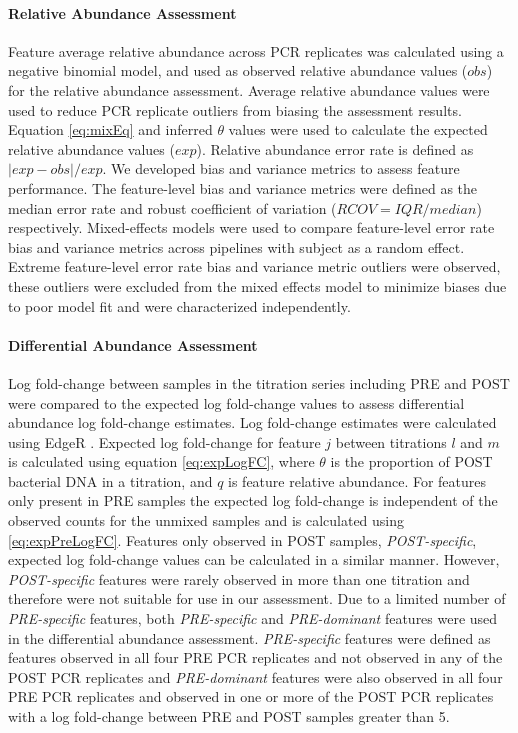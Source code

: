\documentclass[linenumbers]{bmcart}
\begin{document}
\paragraph{Relative Abundance Assessment}

Feature average relative abundance across PCR
replicates was calculated using a negative binomial model, and used as
observed relative abundance values (\(obs\)) for the relative abundance
assessment. Average relative abundance values were used to reduce PCR
replicate outliers from biasing the assessment results. Equation
\eqref{eq:mixEq} and inferred \(\theta\) values were used to calculate the
expected relative abundance values (\(exp\)). Relative abundance error
rate is defined as \(|exp - obs|/exp\).
We developed bias and variance metrics to assess feature performance.
The feature-level bias and variance metrics were defined as the median
error rate and robust coefficient of variation (\(RCOV=IQR/median\))
respectively. Mixed-effects models were used to compare feature-level
error rate bias and variance metrics across pipelines with subject as a
random effect. Extreme feature-level error rate bias and variance metric
outliers were observed, these outliers were excluded from the mixed
effects model to minimize biases due to poor model fit and were
characterized independently.

\paragraph{Differential Abundance Assessment}

Log fold-change between samples in the titration series including PRE
and POST were compared to the expected log fold-change values to assess
differential abundance log fold-change estimates. Log fold-change
estimates were calculated using EdgeR
\cite{Robinson2010, McCarthy2012}. Expected log fold-change for feature
\(j\) between titrations \(l\) and \(m\) is calculated using equation
\eqref{eq:expLogFC}, where \(\theta\) is the proportion of POST bacterial
DNA in a titration, and \(q\) is feature relative abundance. For
features only present in PRE samples the expected log fold-change is
independent of the observed counts for the unmixed samples and is
calculated using \eqref{eq:expPreLogFC}. Features only observed in POST
samples, \emph{POST-specific}, expected log fold-change values can be
calculated in a similar manner. However, \emph{POST-specific} features
were rarely observed in more than one titration and therefore were not
suitable for use in our assessment. Due to a limited number of
\emph{PRE-specific} features, both \emph{PRE-specific} and
\emph{PRE-dominant} features were used in the differential abundance
assessment. \emph{PRE-specific} features were defined as features
observed in all four PRE PCR replicates and not observed in any of the
POST PCR replicates and \emph{PRE-dominant} features were also observed
in all four PRE PCR replicates and observed in one or more of the POST
PCR replicates with a log fold-change between PRE and POST samples
greater than 5.
\end{document}
